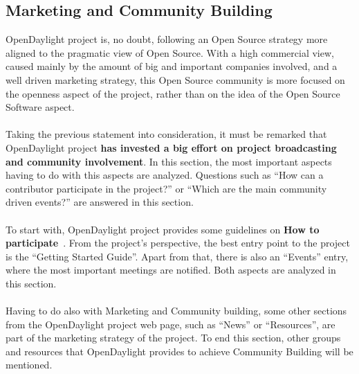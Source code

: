 \documentclass[a4paper, 12pt]{book}
\begin{document}
\subsection{Marketing and Community Building}
OpenDaylight project is, no doubt, following an Open Source strategy more aligned to the pragmatic view of Open Source. With a high commercial view, caused mainly by the amount of big and important companies involved, and a well driven marketing strategy, this Open Source community is more focused on the openness aspect of the project, rather than on the idea of the Open Source Software aspect.\\
\\
Taking the previous statement into consideration, it must be remarked that OpenDaylight project \textbf{has invested a big effort on project broadcasting and community involvement}. In this section, the most important aspects having to do with this aspects are analyzed. Questions such as ``How can a contributor participate in the project?'' or ``Which are the main community driven events?'' are answered in this section.\\
\\
To start with, OpenDaylight project provides some guidelines on \textbf{How to participate}~\cite{OpenDaylightHowToParticipate}. From the project's perspective, the best entry point to the project is the ``Getting Started Guide''. Apart from that, there is also an ``Events'' entry, where the most important meetings are notified. Both aspects are analyzed in this section.\\
\\
Having to do also with Marketing and Community building, some other sections from the OpenDaylight project web page, such as ``News'' or ``Resources'', are part of the marketing strategy of the project. To end this section, other groups and resources that OpenDaylight provides to achieve Community Building will be mentioned.
\end{document}
